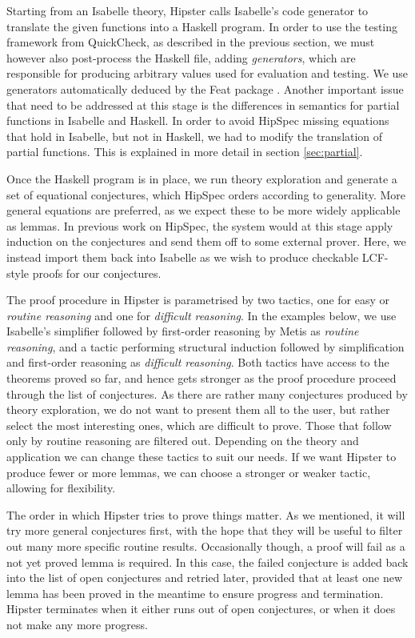 Starting from an Isabelle theory, Hipster calls Isabelle's code generator \cite{codegen} to translate the given functions into a Haskell program. In order to use the testing framework from QuickCheck, as described in the previous section, we must however also post-process the Haskell file, adding \emph{generators}, which are responsible for producing arbitrary values used for evaluation and testing. We use generators automatically deduced by the Feat package \cite{feat}. Another important issue that need to be addressed at this stage is the differences in semantics for partial functions in Isabelle and Haskell. In order to avoid HipSpec missing equations that hold in Isabelle, but not in Haskell, we had to modify the translation of partial functions. This is explained in more detail in section \ref{sec:partial}.

Once the Haskell program is in place, we run theory exploration and generate a set of equational conjectures, which HipSpec orders according to generality. More general equations are preferred, as we expect these to be more widely applicable as lemmas. In previous work on HipSpec, the system would at this stage apply induction on the conjectures and send them off to some external prover. Here, we instead import them back into Isabelle as we wish to produce checkable LCF-style proofs for our conjectures. 

The proof procedure in Hipster is parametrised by two tactics, one for easy or \emph{routine reasoning} and one for \emph{difficult reasoning}. In the examples below, we use Isabelle's simplifier followed by first-order reasoning by Metis as \emph{routine reasoning}, and a tactic performing structural induction followed by simplification and first-order reasoning as \emph{difficult reasoning}. Both tactics have access to the theorems proved so far, and hence gets stronger as the proof procedure proceed through the list of conjectures. As there are rather many conjectures produced by theory exploration, we do not want to present them all to the user, but rather select the most interesting ones, which are difficult to prove. Those that follow only by routine reasoning are filtered out. 
Depending on the theory and application we can change these tactics to suit our needs. If we want Hipster to produce fewer or more lemmas, we can choose a stronger or weaker tactic, allowing for flexibility.  

The order in which Hipster tries to prove things matter. As we mentioned, it will try more general conjectures first, with the hope that they will be useful to filter out many more specific routine results. Occasionally though, a proof will fail as a not yet proved lemma is required. In this case, the failed conjecture is added back into the list of open conjectures and retried later, provided that at least one new lemma has been proved in the meantime to ensure progress and termination. Hipster terminates when it either runs out of open conjectures, or when it does not make any more progress. 

